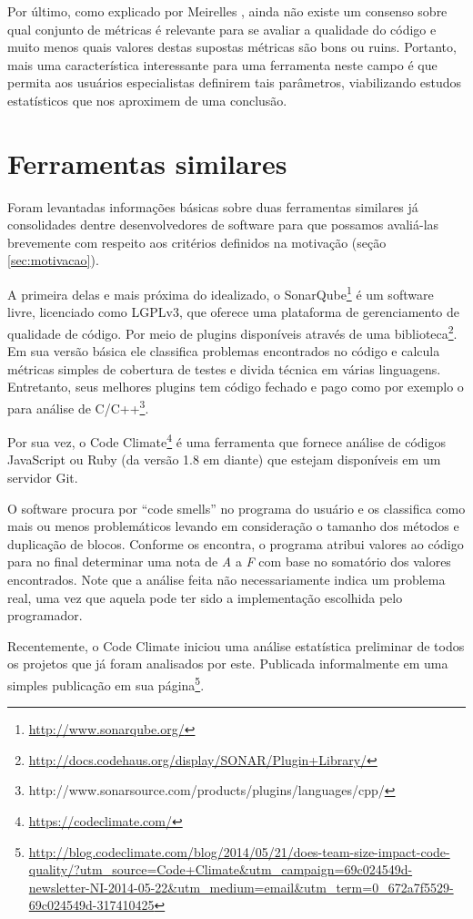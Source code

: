 \documentclass[12pt]{article}
\begin{document}
Por último, como explicado por Meirelles \cite{m13}, ainda não existe um consenso sobre qual conjunto de métricas é relevante para se avaliar a qualidade do código e muito menos quais valores destas supostas métricas são bons ou ruins. Portanto, mais uma característica interessante para uma ferramenta neste campo é que permita aos usuários especialistas definirem tais parâmetros, viabilizando estudos estatísticos que nos aproximem de uma conclusão.

\section{Ferramentas similares}
Foram levantadas informações básicas sobre duas ferramentas similares já consolidades dentre desenvolvedores de software para que possamos avaliá-las brevemente com respeito aos critérios definidos na motivação (seção \ref{sec:motivacao}).

A primeira delas e mais próxima do idealizado, o SonarQube\footnote{\url{http://www.sonarqube.org/}} é um software livre, licenciado como LGPLv3, que oferece uma plataforma de gerenciamento de qualidade de código. Por meio de plugins disponíveis através de uma biblioteca\footnote{\url{http://docs.codehaus.org/display/SONAR/Plugin+Library/}}. Em sua versão básica ele classifica problemas encontrados no código e calcula métricas simples de cobertura de testes e divida técnica em várias linguagens. Entretanto, seus melhores plugins tem código fechado e pago como por exemplo o para análise de C/C++\footnote{http://www.sonarsource.com/products/plugins/languages/cpp/}.

Por sua vez, o Code Climate\footnote{\url{https://codeclimate.com/}} é uma ferramenta que fornece análise de códigos JavaScript ou Ruby (da versão 1.8 em diante) que estejam disponíveis em um servidor Git.

O software procura por ``code smells'' no programa do usuário e os classifica como mais ou menos problemáticos levando em consideração o tamanho dos métodos e duplicação de blocos. Conforme os encontra, o programa atribui valores ao código para no final determinar uma nota de \textit{A} a \textit{F} com base no somatório dos valores encontrados. Note que a análise feita não necessariamente indica um problema real, uma vez que aquela pode ter sido a implementação escolhida pelo programador.

Recentemente, o Code Climate iniciou uma análise estatística preliminar de todos os projetos que já foram analisados por este. Publicada informalmente em uma simples publicação em sua página\footnote{\url{http://blog.codeclimate.com/blog/2014/05/21/does-team-size-impact-code-quality/?utm_source=Code+Climate&utm_campaign=69c024549d-newsletter-NI-2014-05-22&utm_medium=email&utm_term=0_672a7f5529-69c024549d-317410425}}.
\end{document}

